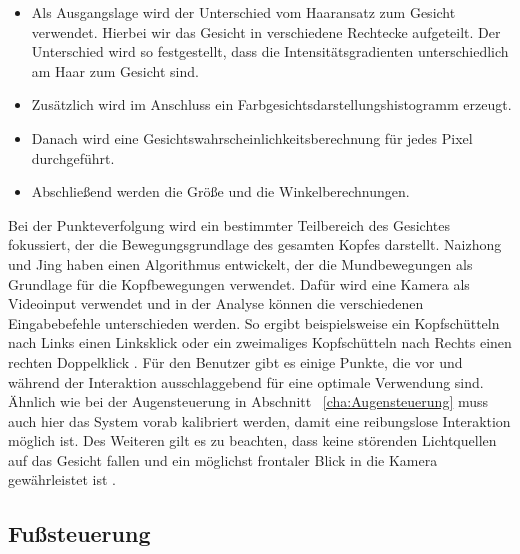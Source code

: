 \begin{itemize}
      \item Als Ausgangslage wird der Unterschied vom Haaransatz zum Gesicht verwendet. Hierbei wir das Gesicht in verschiedene Rechtecke aufgeteilt. Der Unterschied wird so festgestellt, dass die Intensitätsgradienten unterschiedlich am Haar zum Gesicht sind.
      \item Zusätzlich wird im Anschluss ein Farbgesichtsdarstellungshistogramm erzeugt.
			\item Danach wird eine Gesichtswahrscheinlichkeitsberechnung für jedes Pixel durchgeführt.
			\item Abschließend werden die Größe und die Winkelberechnungen.
\end{itemize}
\vspace{\baselineskip}
Bei der Punkteverfolgung wird ein bestimmter Teilbereich des Gesichtes fokussiert, der die Bewegungsgrundlage des gesamten Kopfes darstellt. Naizhong und Jing \cite{MouthChinaControl} haben einen Algorithmus entwickelt, der die Mundbewegungen als Grundlage für die Kopfbewegungen verwendet. Dafür wird eine Kamera als Videoinput verwendet und in der Analyse können die verschiedenen Eingabebefehle unterschieden werden. So ergibt beispielsweise ein Kopfschütteln nach Links einen Linksklick oder ein zweimaliges Kopfschütteln nach Rechts einen rechten Doppelklick \cite{MouthChinaControl}.
\newline \newline
Für den Benutzer gibt es einige Punkte, die vor und während der Interaktion ausschlaggebend für eine optimale Verwendung sind. Ähnlich wie bei der Augensteuerung in Abschnitt ~\ref{cha:Augensteuerung} muss auch hier das System vorab kalibriert werden, damit eine reibungslose Interaktion möglich ist. Des Weiteren gilt es zu beachten, dass keine störenden Lichtquellen auf das Gesicht fallen und ein möglichst frontaler Blick in die Kamera gewährleistet ist \cite{MouthChinaControl}.


\subsection{Fußsteuerung}

